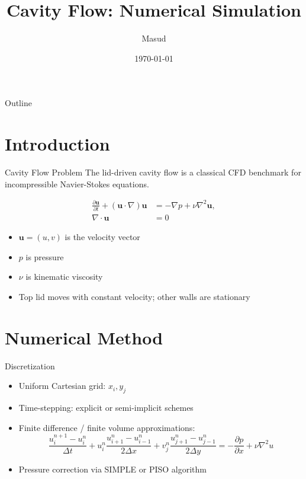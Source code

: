 \documentclass{beamer}
\title{Cavity Flow: Numerical Simulation}
\author{Masud}
\date{\today}
\begin{document}
\begin{frame}
\titlepage
\end{frame}

\begin{frame}{Outline}
\tableofcontents
\end{frame}

\section{Introduction}
\begin{frame}{Cavity Flow Problem}
The lid-driven cavity flow is a classical CFD benchmark for incompressible Navier-Stokes equations.

\[
\begin{aligned}
\frac{\partial \mathbf{u}}{\partial t} + (\mathbf{u} \cdot \nabla) \mathbf{u} &= - \nabla p + \nu \nabla^2 \mathbf{u}, \\
\nabla \cdot \mathbf{u} &= 0
\end{aligned}
\]

\begin{itemize}
    \item $\mathbf{u} = (u,v)$ is the velocity vector
    \item $p$ is pressure
    \item $\nu$ is kinematic viscosity
    \item Top lid moves with constant velocity; other walls are stationary
\end{itemize}
\end{frame}

\section{Numerical Method}
\begin{frame}{Discretization}
\begin{itemize}
    \item Uniform Cartesian grid: $x_i, y_j$
    \item Time-stepping: explicit or semi-implicit schemes
    \item Finite difference / finite volume approximations:
    \[
    \frac{u_i^{n+1}-u_i^n}{\Delta t} + u_i^n \frac{u_{i+1}^n - u_{i-1}^n}{2 \Delta x} + v_j^n \frac{u_{j+1}^n - u_{j-1}^n}{2 \Delta y} = -\frac{\partial p}{\partial x} + \nu \nabla^2 u
    \]
    \item Pressure correction via SIMPLE or PISO algorithm
\end{itemize}
\end{frame}
\end{document}
